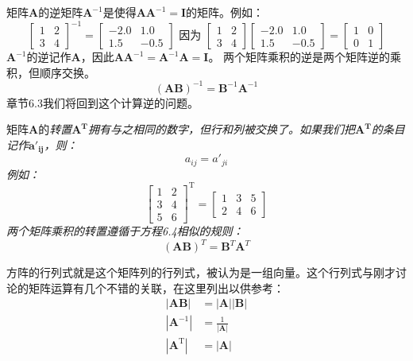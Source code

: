矩阵$\mathbf{A}$的逆矩阵$\mathbf{A}^{-1}$是使得$\mathbf{A}\mathbf{A}^{-1} = \mathbf{I}$的矩阵。例如：
\[
  \left[\begin{array}{ll}
      1 & 2 \\
      3 & 4
    \end{array}\right]^{-1}=\left[\begin{array}{rr}
      -2.0 & 1.0  \\
      1.5  & -0.5
    \end{array}\right] \text { 因为 }\left[\begin{array}{ll}
      1 & 2 \\
      3 & 4
    \end{array}\right]\left[\begin{array}{rr}
      -2.0 & 1.0  \\
      1.5  & -0.5
    \end{array}\right]=\left[\begin{array}{ll}
      1 & 0 \\
      0 & 1
    \end{array}\right]
\]
$\mathbf{A}^{-1}$的逆记作$\mathbf{A}$，因此$\mathbf{AA}^{-1} = \mathbf{A}^{-1}\mathbf{A} = \mathbf{I}$。
两个矩阵乘积的逆是两个矩阵逆的乘积，但顺序交换。
\begin{equation}
  (\mathbf{A B})^{-1} = \mathbf{B}^{-1} \mathbf{A}^{-1}
\end{equation}
章节6.3我们将回到这个计算逆的问题。

矩阵$\mathbf{A}$的\it{转置}$\mathbf{A^T}$拥有与之相同的数字，但行和列被交换了。如果我们把$\mathbf{A^T}$的条目记作$\mathbf{a'_{ij}}$，则：
\[
a_{ij} = a'_{ji}
\]
例如：
\[
  \left[\begin{array}{ll}
      1 & 2 \\
      3 & 4 \\
      5 & 6
    \end{array}\right]^{\mathrm{T}}=\left[\begin{array}{lll}
      1 & 3 & 5 \\
      2 & 4 & 6
    \end{array}\right]
\]
两个矩阵乘积的转置遵循于方程6.4相似的规则：\[(\mathbf{AB})^T=\mathbf{B}^T\mathbf{A}^T\]

方阵的行列式就是这个矩阵列的行列式，被认为是一组向量。这个行列式与刚才讨论的矩阵运算有几个不错的关联，在这里列出以供参考：
\begin{align}
  |\mathbf{A B}|                       & = |\mathbf{A}| |\mathbf{B}| \\
  \left|\mathbf{A}^{-1}\right|         & = \frac{1}{|\mathbf{A}|}    \\
  \left|\mathbf{A}^{\mathrm{T}}\right| & = |\mathbf{A}|
\end{align}

